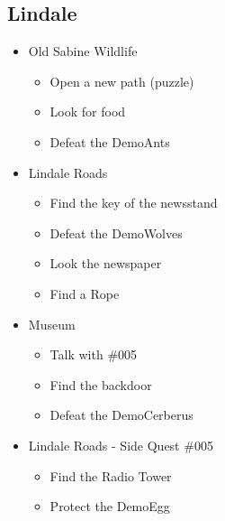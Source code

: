 \subsection{Lindale}
\begin{itemize}
	\item Old Sabine Wildlife
	\begin{itemize}
		\item Open a new path (puzzle)
		\item Look for food
		\item Defeat the DemoAnts
	\end{itemize}
	\item Lindale Roads
	\begin{itemize}	
		\item Find the key of the newsstand
		\item Defeat the DemoWolves
		\item Look the newspaper
		\item Find a Rope
	\end{itemize}
	\item Museum
	\begin{itemize}
		\item Talk with \#005
		\item Find the backdoor
		\item Defeat the DemoCerberus
	\end{itemize}
	\item Lindale Roads - Side Quest \#005
	\begin{itemize}
		\item Find the Radio Tower
		\item Protect the DemoEgg
	\end{itemize}
\end{itemize}

